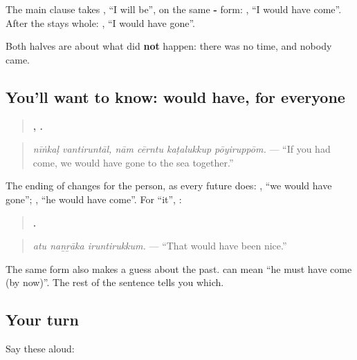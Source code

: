 The main clause takes \textbf{}, \textquotedblleft{}I will be\textquotedblright{}, on the same \textbf{-} form: \textbf{}, \textquotedblleft{}I would have come\textquotedblright{}. After \textbf{} the \textbf{} stays whole: \textbf{}, \textquotedblleft{}I would have gone\textquotedblright{}.

Both halves are about what did \textbf{not} happen: there was no time, and nobody came.

\subsection*{You'll want to know: would have, for everyone}
\begin{quote}
\textbf{ ,    .}
\end{quote}

\begin{quote}
\emph{nīṅkaḷ vantiruntāl, nām cērntu kaṭalukkup pōyiruppōm.} — \textquotedblleft{}If you had come, we would have gone to the sea together.\textquotedblright{}
\end{quote}

The ending of \textbf{} changes for the person, as every future does: \textbf{}, \textquotedblleft{}we would have gone\textquotedblright{}; \textbf{}, \textquotedblleft{}he would have come\textquotedblright{}. For \textquotedblleft{}it\textquotedblright{}, \textbf{}:

\begin{quote}
\textbf{  .}
\end{quote}

\begin{quote}
\emph{atu naṉṟāka iruntirukkum.} — \textquotedblleft{}That would have been nice.\textquotedblright{}
\end{quote}

The same form also makes a guess about the past. \textbf{ } can mean \textquotedblleft{}he must have come (by now)\textquotedblright{}. The rest of the sentence tells you which.

\subsection*{Your turn}
Say these aloud:

